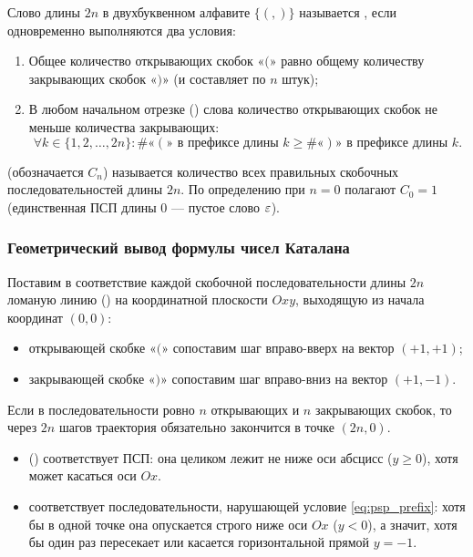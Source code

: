 \begin{definition}
    Слово длины $2n$ в двухбуквенном алфавите $\{ (, ) \}$ называется 
    , если 
    одновременно выполняются два условия:
    \begin{enumerate}
        \item Общее количество открывающих скобок «$($» равно общему 
        количеству закрывающих скобок «$)$» (и составляет по $n$ штук);
        \item В любом начальном отрезке () слова 
        количество открывающих скобок не меньше количества закрывающих:
        \begin{equation} \label{eq:psp_prefix}
            \forall k \in \{1, 2, \dots, 2n\} : 
            \#\text{«}(\text{» в префиксе длины } k \ge 
            \#\text{«})\text{» в префиксе длины } k. \tag{1}
        \end{equation}
    \end{enumerate}
\end{definition}

\begin{definition}
     (обозначается $C_n$) называется 
    количество всех правильных скобочных последовательностей длины $2n$. 
    По определению при $n = 0$ полагают $C_0 = 1$ (единственная ПСП длины 
    $0$ --- пустое слово $\varepsilon$).
\end{definition}

\subsubsection{Геометрический вывод формулы чисел Каталана}

Поставим в соответствие каждой скобочной последовательности длины $2n$ 
ломаную линию () на координатной плоскости $Oxy$, 
выходящую из начала координат $(0, 0)$:
\begin{itemize}
    \item открывающей скобке «$($» сопоставим шаг вправо-вверх на вектор 
    $(+1, +1)$;
    \item закрывающей скобке «$)$» сопоставим шаг вправо-вниз на вектор 
    $(+1, -1)$.
\end{itemize}

Если в последовательности ровно $n$ открывающих и $n$ закрывающих скобок, 
то через $2n$ шагов траектория обязательно закончится в точке $(2n, 0)$.
\begin{itemize}
    \item {} () соответствует 
    ПСП: она целиком лежит не ниже оси абсцисс ($y \ge 0$), хотя может 
    касаться оси $Ox$.
    \item {} соответствует последовательности, 
    нарушающей условие \eqref{eq:psp_prefix}: хотя бы в одной точке она 
    опускается строго ниже оси $Ox$ ($y < 0$), а значит, хотя бы один раз 
    пересекает или касается горизонтальной прямой $y = -1$.
\end{itemize}

